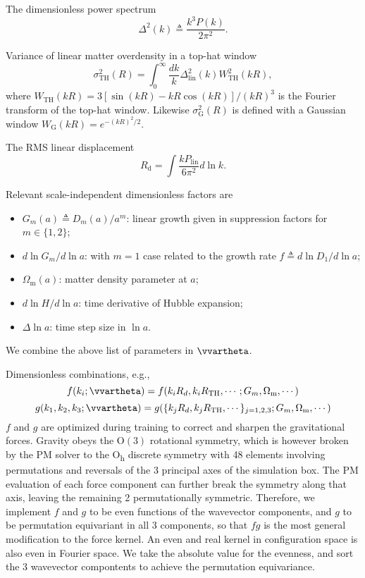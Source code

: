 \documentclass[modern, trackchanges, dvipsnames]{aastex631}
\renewcommand{\d}{d}
\newcommand{\lna}{\ln\!a}
\newcommand{\lnk}{\ln\!k}
\newcommand{\Omegam}{\Omega_\mathrm{m}}
\newcommand{\linear}{\mathrm{lin}}
\newcommand{\tophat}{\mathrm{TH}}
\newcommand{\gauss}{\mathrm{G}}
\begin{document}
The dimensionless power spectrum
%
\begin{equation}
\Delta^2(k) \triangleq \frac{k^3 P(k)}{2 \pi^2}.
\end{equation}

Variance of linear matter overdensity in a top-hat window
%
\begin{equation}
\sigma_\tophat^2(R) = \int_0^\infty \frac{\d k}k
  \Delta_\linear^2(k) W_\tophat^2(kR),
\end{equation}
where $W_\tophat(kR) = 3[\sin(kR) - kR\cos(kR)] / (kR)^3$ is the
Fourier transform of the top-hat window.
Likewise $\sigma_\gauss^2(R)$ is defined with a Gaussian window
$W_\gauss(kR) = e^{-(kR)^2/2}$.

The RMS linear displacement
%
\begin{equation}
R_\mathrm{d} = \int \frac{k P_\linear}{6\pi^2} \d\lnk.
\end{equation}
%

Relevant scale-independent dimensionless factors are
\begin{itemize}
\item $G_m(a) \triangleq D_m(a) / a^m$: linear growth given in
  suppression factors for $m \in \{1, 2\}$;
\item $\d\ln G_m / \d\lna$: with $m=1$ case related to the growth rate
  $f \triangleq \d\ln D_1 / \d\lna$;
\item $\Omegam(a)$: matter density parameter at $a$;
\item $\d\ln\!H / \d\lna$: time derivative of Hubble expansion;
\item $\Delta\lna$: time step size in $\lna$.
\end{itemize}

We combine the above list of parameters in $\vvartheta$.

Dimensionless combinations, e.g.,
%
\begin{equation}
f(k_i; \vvartheta) = f(k_iR_d, k_iR_\tophat, \cdots; G_m, \Omegam, \cdots)
\end{equation}
%
\begin{equation}
g(k_1, k_2, k_3; \vvartheta) = g(\{k_jR_d, k_jR_\tophat, \cdots\}_{j=1,2,3}; G_m, \Omegam, \cdots)
\end{equation}
%
$f$ and $g$ are optimized during training to correct and sharpen the
gravitational forces.
Gravity obeys the $\mathrm{O}(3)$ rotational symmetry, which is however
broken by the PM solver to the O\textsubscript{h} discrete symmetry with
48 elements involving permutations and reversals of the 3 principal axes
of the simulation box.
The PM evaluation of each force component can further break the symmetry
along that axis, leaving the remaining 2 permutationally symmetric.
Therefore, we implement $f$ and $g$ to be even functions of the
wavevector components, and $g$ to be permutation equivariant in all 3
components, so that $f g$ is the most general modification to the force
kernel.
An even and real kernel in configuration space is also even in Fourier
space.
We take the absolute value for the evenness, and sort the 3 wavevector
compontents to achieve the permutation equivariance.
\end{document}
